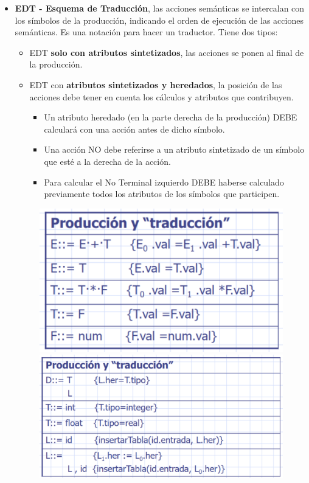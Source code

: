 \documentclass[12pt, twoside, openright]{report} %
\begin{document}
\begin{itemize}
  \item \textbf{EDT - Esquema de Traducción}, las acciones semánticas se intercalan con los símbolos de la producción, indicando el orden de ejecución de las acciones semánticas. Es una notación para hacer un traductor. Tiene dos tipos:
  \begin{itemize}
    \item EDT \textbf{solo con atributos sintetizados}, las acciones se ponen al final de la producción.
    \item EDT con \textbf{atributos sintetizados y heredados}, la posición de las acciones debe tener en cuenta los cálculos y atributos que contribuyen.
    \begin{itemize}
      \item Un atributo heredado (en la parte derecha de la producción) DEBE calculará con una acción antes de dicho símbolo.
      \item Una acción NO debe referirse a un atributo sintetizado de un símbolo que esté a la derecha de la acción.
      \item Para calcular el No Terminal izquierdo DEBE haberse calculado previamente todos los atributos de los símbolos que participen.
    \end{itemize}
  \end{itemize}
  \begin{figure}[H]
    {\includegraphics[scale=.3]{2021-04-21 11_14_06-05_resum_Sem_2021.pdf - Foxit Reader.png}
    \includegraphics[scale=.24]{2021-04-21 11_14_40-05_resum_Sem_2021.pdf - Foxit Reader.png}}
  \end{figure}
\end{itemize}
\end{document}

